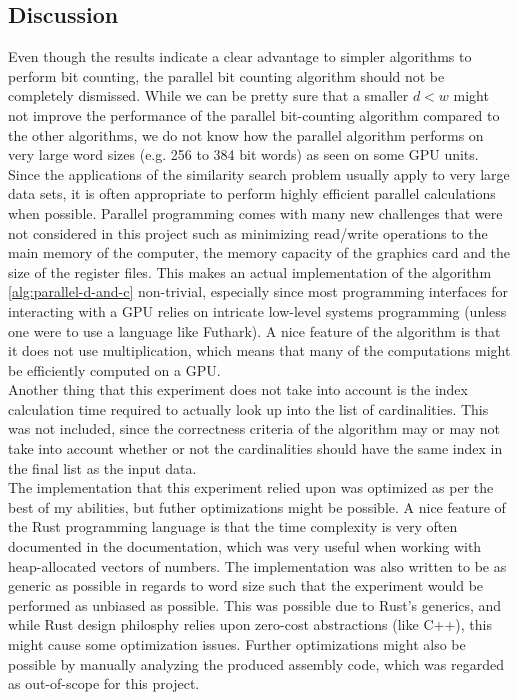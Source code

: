 \subsection{Discussion}
Even though the results indicate a clear advantage to simpler algorithms to perform bit counting, the parallel bit counting algorithm should not be completely dismissed. While we can be pretty sure that a smaller $d < w$ might not improve the performance of the parallel bit-counting algorithm compared to the other algorithms, we do not know how the parallel algorithm performs on very large word sizes (e.g. 256 to 384 bit words) as seen on some GPU units\cite{techpowerup}. Since the applications of the similarity search problem usually apply to very large data sets, it is often appropriate to perform highly efficient parallel calculations when possible. 
Parallel programming comes with many new challenges that were not considered in this project such as minimizing read/write operations to the main memory of the computer, the memory capacity of the graphics card and the size of the register files. 
This makes an actual implementation of the algorithm \ref{alg:parallel-d-and-c} non-trivial, especially since most programming interfaces for interacting with a GPU relies on intricate low-level systems programming (unless one were to use a language like Futhark\cite{futhark}). A nice feature of the algorithm is that it does not use multiplication, which means that many of the computations might be efficiently computed on a GPU.\\
Another thing that this experiment does not take into account is the index calculation time required to actually look up into the list of cardinalities. This was not included, since the correctness criteria of the algorithm may or may not take into account whether or not the cardinalities should have the same index in the final list as the input data.\\
The implementation that this experiment relied upon was optimized as per the best of my abilities, but futher optimizations might be possible. A nice feature of the Rust programming language is that the time complexity is very often documented in the documentation, which was very useful when working with heap-allocated vectors of numbers. The implementation was also written to be as generic as possible in regards to word size such that the experiment would be performed as unbiased as possible. This was possible due to Rust's generics, and while Rust design philosphy relies upon zero-cost abstractions\cite{rust-lang} (like C++), this might cause some optimization issues. Further optimizations might also be possible by manually analyzing the produced assembly code, which was regarded as out-of-scope for this project.\\
